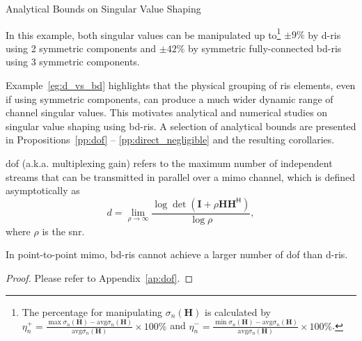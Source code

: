 \begin{section}{Analytical Bounds on Singular Value Shaping}
\begin{example}
		In this example, both singular values can be manipulated up to\footnote{The percentage for manipulating $\sigma_n(\mathbf{H})$ is calculated by $\eta_n^+ = \frac{\max \sigma_n(\mathbf{H}) - \mathrm{avg} \sigma_n(\mathbf{H})}{\mathrm{avg} \sigma_n(\mathbf{H})} \times 100\%$ and  $\eta_n^- = \frac{\min \sigma_n(\mathbf{H}) - \mathrm{avg} \sigma_n(\mathbf{H})}{\mathrm{avg} \sigma_n(\mathbf{H})} \times 100\%$.} $\pm 9\%$ by \gls{d}-\gls{ris} using 2 symmetric components and $\pm 42\%$ by symmetric fully-connected \gls{bd}-\gls{ris} using 3 symmetric components.
	\end{example}

	Example~\ref{eg:d_vs_bd} highlights that the physical grouping of \gls{ris} elements, even if using symmetric components, can produce a much wider dynamic range of channel singular values.
	This motivates analytical and numerical studies on singular value shaping using \gls{bd}-\gls{ris}.
	A selection of analytical bounds are presented in Propositions~\ref{pp:dof} -- \ref{pp:direct_negligible} and the resulting corollaries.


	\begin{definition}
		\gls{dof} (a.k.a. multiplexing gain) refers to the maximum number of independent streams that can be transmitted in parallel over a \gls{mimo} channel, which is defined asymptotically as
		\begin{equation}
			d = \lim_{\rho \to \infty} \frac{\log \det(\mathbf{I} + \rho \mathbf{H} \mathbf{H}^\mathsf{H})}{\log \rho},
		\end{equation}
		where $\rho$ is the \gls{snr}.

	\end{definition}

	\begin{proposition}\label{pp:dof}
		In point-to-point \gls{mimo}, \gls{bd}-\gls{ris} cannot achieve a larger number of \gls{dof} than \gls{d}-\gls{ris}.
	\end{proposition}
	\begin{proof}
		Please refer to Appendix~\ref{ap:dof}.
	\end{proof}


\end{section}
